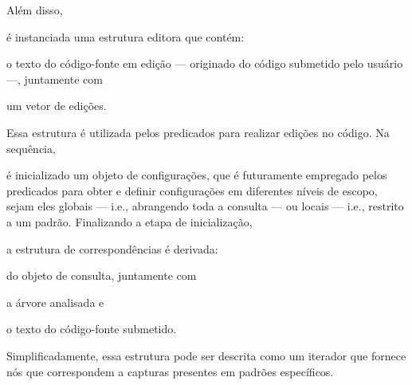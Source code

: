 \documentclass
  [11pt,a4paper,english,brazil,openright,sumario=tradicional,twoside]
  {abntex2}
\begin{document}
\begin{inparaenum}
          Além disso,
    \item é instanciada uma estrutura editora que contém:
          \begin{inparaenum}
            \item o texto do código-fonte em edição --- originado do código
                  submetido pelo usuário ---, juntamente com
            \item um vetor de edições.
          \end{inparaenum}
          Essa estrutura é utilizada pelos predicados para realizar edições no
          código. Na sequência,
    \item é inicializado um objeto de configurações, que é futuramente
          empregado pelos predicados para obter e definir configurações em
          diferentes níveis de escopo, sejam eles globais --- i.e., abrangendo
          toda a consulta --- ou locais --- i.e., restrito a um padrão.
          Finalizando a etapa de inicialização,
    \item a estrutura de correspondências é derivada:
          \begin{inparaenum}
            \item do objeto de consulta, juntamente com
            \item a árvore analisada e
            \item o texto do código-fonte submetido.
          \end{inparaenum}
          Simplificadamente, essa estrutura pode ser descrita como um iterador
          que fornece nós que correspondem a capturas presentes em padrões
          específicos.
  \end{inparaenum}
\end{document}
